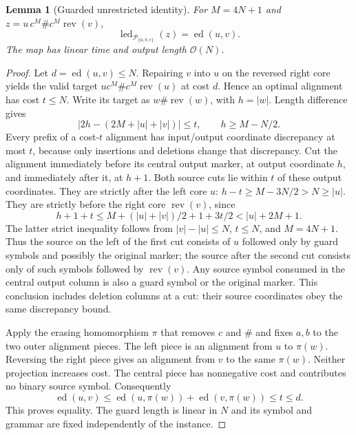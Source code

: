 \documentclass[sigconf,screen]{acmart}
\newcommand{\ED}{\operatorname{ed}}
\newcommand{\LED}{\operatorname{led}}
\newcommand{\rev}{\operatorname{rev}}
\newcommand{\Pal}{\mathcal P}
\newcommand{\Oh}{\mathcal O}
\newtheorem{lemma}[theorem]{Lemma}
\theoremstyle{definition}
\begin{document}
\begin{lemma}[Guarded unrestricted identity]\label{lem:guard}
For $M=4N+1$ and $z=u\,c^M\#c^M\rev(v)$,
\begin{equation}\label{eq:guard}
 \LED_{\Pal_{\{a,b,c\}}}(z)=\ED(u,v).
\end{equation}
The map has linear time and output length $\Oh(N)$.
\end{lemma}
\begin{proof}
Let $d=\ED(u,v)\le N$. Repairing $v$ into $u$ on the reversed right core yields the valid target $u c^M\#c^M\rev(u)$ at cost $d$. Hence an optimal alignment has cost $t\le N$. Write its target as $w\#\rev(w)$, with $h=|w|$. Length difference gives
\[
 |2h-(2M+|u|+|v|)|\le t,
 \qquad h\ge M-N/2.
\]
Every prefix of a cost-$t$ alignment has input/output coordinate discrepancy at most $t$, because only insertions and deletions change that discrepancy. Cut the alignment immediately before its central output marker, at output coordinate $h$, and immediately after it, at $h+1$. Both source cuts lie within $t$ of these output coordinates. They are strictly after the left core $u$: $h-t\ge M-3N/2>N\ge|u|$. They are strictly before the right core $\rev(v)$, since
\[
 h+1+t\le M+(|u|+|v|)/2+1+3t/2
          < |u|+2M+1.
\]
The latter strict inequality follows from $|v|-|u|\le N$, $t\le N$, and $M=4N+1$. Thus the source on the left of the first cut consists of $u$ followed only by guard symbols and possibly the original marker; the source after the second cut consists only of such symbols followed by $\rev(v)$. Any source symbol consumed in the central output column is also a guard symbol or the original marker. This conclusion includes deletion columns at a cut: their source coordinates obey the same discrepancy bound.

Apply the erasing homomorphism $\pi$ that removes $c$ and $\#$ and fixes $a,b$ to the two outer alignment pieces. The left piece is an alignment from $u$ to $\pi(w)$. Reversing the right piece gives an alignment from $v$ to the same $\pi(w)$. Neither projection increases cost. The central piece has nonnegative cost and contributes no binary source symbol. Consequently
\[
 \ED(u,v)\le\ED(u,\pi(w))+\ED(v,\pi(w))\le t\le d.
\]
This proves equality. The guard length is linear in $N$ and its symbol and grammar are fixed independently of the instance.
\end{proof}
\end{document}

